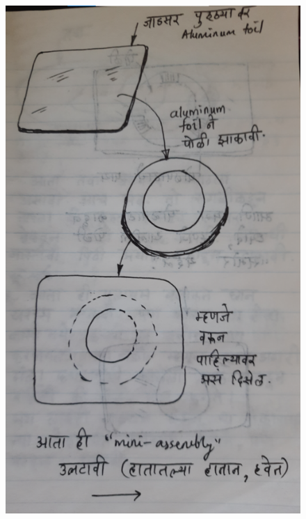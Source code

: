 \documentclass[17pt]{extarticle}  %
\begin{document}
\begin{figure}[h!]
    \centering
    \includegraphics{img/13-s.png}
\end{figure}
\end{document}
